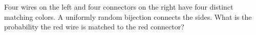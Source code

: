 Four wires on the left and four connectors on the right have four distinct matching colors. A uniformly random bijection connects the sides. What is the probability the red wire is matched to the red connector?
